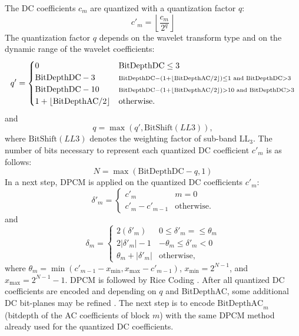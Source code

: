 The DC coefficients $c_m$ are quantized with a quantization factor $q$:
\begin{equation}
c'_m=\left\lfloor\frac{c_m}{2^q}\right\rfloor
\end{equation}
The quantization factor $q$ depends on the wavelet transform type and on the dynamic range of the wavelet coefficients:
\begin{equation}
q'=
\begin{cases}
  0                                                 & \mathrm{BitDepthDC}\leq 3\\
  \mathrm{BitDepthDC}-3                             & \mathsmaller{\mathrm{BitDepthDC}-(1+\left\lfloor\mathrm{BitDepthAC}/2\right\rfloor)\leq 1\text{ and }\mathrm{BitDepthDC}>3}\\
  \mathrm{BitDepthDC}-10                            & \mathsmaller{\mathrm{BitDepthDC}-(1+\left\lfloor\mathrm{BitDepthAC}/2\right\rfloor)> 10\text{ and }\mathrm{BitDepthDC}>3}\\
  1+\left\lfloor\mathrm{BitDepthAC}/2\right\rfloor  & \text{otherwise}.
\end{cases}
\end{equation}
and
\begin{equation}
q=\max(q', \mathrm{BitShift}(LL3)),
\end{equation}
where $\mathrm{BitShift}(LL3)$ denotes the weighting factor of sub-band $\mathrm{LL}_3$. The number of bits necessary to represent each quantized DC coefficient $c'_m$ is as follows:
\begin{equation}
N=\max(\mathrm{BitDepthDC}-q,1)
\end{equation}
In a next step, \gls{DPCM} is applied on the quantized DC coefficients $c'_m$:
\begin{equation}
\delta'_m=
\begin{cases}
  c'_m          & m=0\\
  c'_m-c'_{m-1} & \text{otherwise}.
\end{cases}
\end{equation}
and
\begin{equation}
\delta_m=
\begin{cases}
  2(\delta'_m)                    & 0\leq\delta'_m=\leq\theta_m\\
  2\left|\delta'_m\right|-1       & -\theta_m\leq\delta'_m<0\\
  \theta_m+\left|\delta'_m\right| & \text{otherwise},
\end{cases}
\end{equation}
where $\theta_m=\min(c'_{m-1}-x_{\mathrm{min}},x_{\mathrm{max}}-c'_{m-1})$, $x_\mathrm{min}=2^{N-1}$, and $x_\mathrm{max}=2^{N-1}-1$. \gls{DPCM} is followed by Rice Coding \cite[p.~4-19ff]{CCSDS122blue}. After all quantized DC coefficients are encoded and depending on $q$ and BitDepthAC, some additional DC bit-planes may be refined \cite[section~4.3.3]{CCSDS122blue}. The next step is to encode $\mathrm{BitDepthAC}_m$ (bitdepth of the AC coefficients of block $m$) with the same \gls{DPCM} method already used for the quantized DC coefficients.

